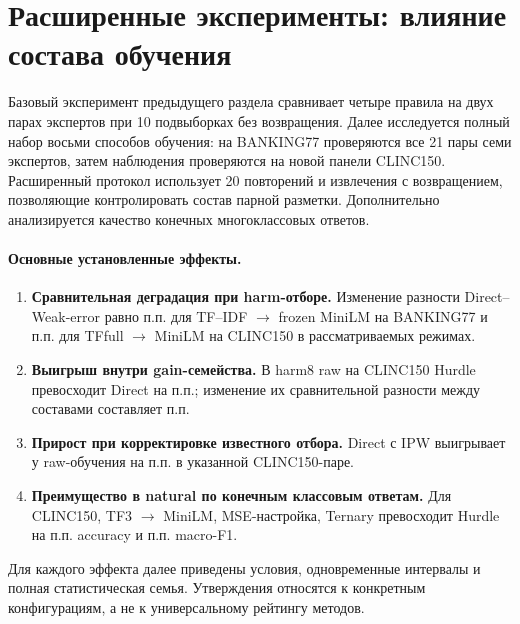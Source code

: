 \clearpage
\section{Расширенные эксперименты: влияние состава обучения}
\label{sec:additive_results}
Базовый эксперимент предыдущего раздела сравнивает четыре правила
на двух парах экспертов при 10 подвыборках без возвращения.
Далее исследуется полный набор восьми способов обучения:
на BANKING77 проверяются все 21 пары семи экспертов,
затем наблюдения проверяются на новой панели CLINC150.
Расширенный протокол использует 20 повторений и извлечения
с возвращением, позволяющие контролировать состав парной разметки.
Дополнительно анализируется качество конечных многоклассовых ответов.

\paragraph{Основные установленные эффекты.}
\begin{enumerate}
\item \textbf{Сравнительная деградация при harm-отборе.}
Изменение разности Direct--Weak-error равно \BankShiftEffect{} п.п.
для TF--IDF $\to$ frozen MiniLM на BANKING77 и \ClincShiftEffect{} п.п.
для TFfull $\to$ MiniLM на CLINC150 в рассматриваемых режимах.
\item \textbf{Выигрыш внутри gain-семейства.}
В harm8 raw на CLINC150 Hurdle превосходит Direct на
\HurdleSimpleEffect{} п.п.; изменение их сравнительной разности
между составами составляет \HurdleShiftEffect{} п.п.
\item \textbf{Прирост при корректировке известного отбора.}
Direct с IPW выигрывает у raw-обучения на \CorrectionEffect{} п.п.
в указанной CLINC150-паре.
\item \textbf{Преимущество в natural по конечным классовым ответам.}
Для CLINC150, TF3 $\to$ MiniLM, MSE-настройка,
Ternary превосходит Hurdle на \NaturalAccuracyEffect{} п.п. accuracy
и \NaturalFoneEffect{} п.п. macro-F1.
\end{enumerate}
Для каждого эффекта далее приведены условия, одновременные интервалы
и полная статистическая семья. Утверждения относятся к конкретным
конфигурациям, а не к универсальному рейтингу методов.









